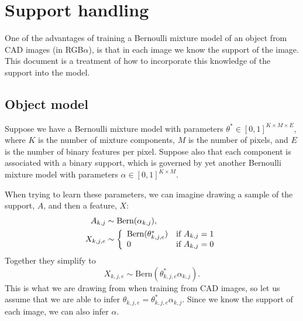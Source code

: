 \documentclass{article}
\newcommand{\Bern}[1]{\text{Bern}(#1)}
\begin{document}


\section{Support handling}
One of the advantages of training a Bernoulli mixture model of an object from CAD images (in RGB$\alpha$), is that in each image we know the support of the image. This document is a treatment of how to incorporate this knowledge of the support into the model.
%
%
%


\subsection{Object model}
Suppose we have a Bernoulli mixture model with parameters $\theta^* \in [0, 1]^{K \times M \times E}$, where $K$ is the number of mixture components, $M$ is the number of pixels, and $E$ is the number of binary features per pixel. Suppose also that each component is associated with a binary support, which is governed by yet another Bernoulli mixture model with parameters $\alpha \in [0, 1]^{K \times M}$.

When trying to learn these parameters, we can imagine drawing a sample of the support, $A$, and then a feature, $X$:
\begin{align*}
    A_{k,j} & \sim \Bern{\alpha_{k,j}}, \\
    X_{k,j,e} & \sim \left\{
        \begin{array}{l l}
            \Bern{\theta^*_{k,j,e}} & \text{if }A_{k,j} = 1  \\
            0 & \text{if }A_{k,j} = 0
        \end{array} \right.
\end{align*}
Together they simplify to 
\[
    X_{k,j,e} \sim \Bern{\theta^*_{k,j,e} \alpha_{k,j}}.
\] 
This is what we are drawing from when training from CAD images, so let us assume that we are able to infer $\theta_{k,j,e} = \theta^*_{k,j,e} \alpha_{k,j}$. Since we know the support of each image, we can also infer $\alpha$.
\end{document}

